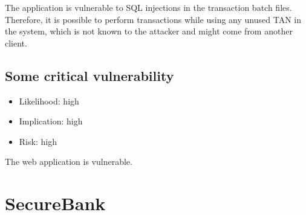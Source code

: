 The application is vulnerable to SQL injections in the transaction batch files. Therefore, it is possible to perform transactions while using any unused TAN in the system, which is not known to the attacker and might come from another client.

\subsection{Some critical vulnerability}
\begin{itemize}
	\item Likelihood: high
	\item Implication: high
	\item Risk: high
\end{itemize}

The web application is vulnerable.

\section{SecureBank}
